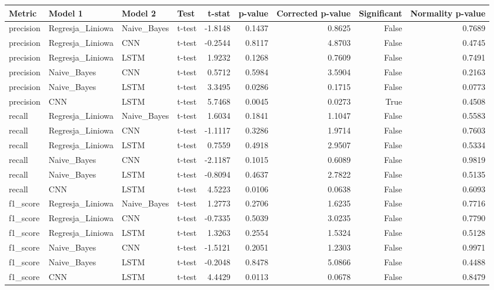 \begin{tabular}{llllrrrrr}
\toprule
Metric & Model 1 & Model 2 & Test & t-stat & p-value & Corrected p-value & Significant & Normality p-value \\
\midrule
precision & Regresja_Liniowa & Naive_Bayes & t-test & -1.8148 & 0.1437 & 0.8625 & False & 0.7689 \\
precision & Regresja_Liniowa & CNN & t-test & -0.2544 & 0.8117 & 4.8703 & False & 0.4745 \\
precision & Regresja_Liniowa & LSTM & t-test & 1.9232 & 0.1268 & 0.7609 & False & 0.7491 \\
precision & Naive_Bayes & CNN & t-test & 0.5712 & 0.5984 & 3.5904 & False & 0.2163 \\
precision & Naive_Bayes & LSTM & t-test & 3.3495 & 0.0286 & 0.1715 & False & 0.0773 \\
precision & CNN & LSTM & t-test & 5.7468 & 0.0045 & 0.0273 & True & 0.4508 \\
recall & Regresja_Liniowa & Naive_Bayes & t-test & 1.6034 & 0.1841 & 1.1047 & False & 0.5583 \\
recall & Regresja_Liniowa & CNN & t-test & -1.1117 & 0.3286 & 1.9714 & False & 0.7603 \\
recall & Regresja_Liniowa & LSTM & t-test & 0.7559 & 0.4918 & 2.9507 & False & 0.5334 \\
recall & Naive_Bayes & CNN & t-test & -2.1187 & 0.1015 & 0.6089 & False & 0.9819 \\
recall & Naive_Bayes & LSTM & t-test & -0.8094 & 0.4637 & 2.7822 & False & 0.5135 \\
recall & CNN & LSTM & t-test & 4.5223 & 0.0106 & 0.0638 & False & 0.6093 \\
f1_score & Regresja_Liniowa & Naive_Bayes & t-test & 1.2773 & 0.2706 & 1.6235 & False & 0.7716 \\
f1_score & Regresja_Liniowa & CNN & t-test & -0.7335 & 0.5039 & 3.0235 & False & 0.7790 \\
f1_score & Regresja_Liniowa & LSTM & t-test & 1.3263 & 0.2554 & 1.5324 & False & 0.5128 \\
f1_score & Naive_Bayes & CNN & t-test & -1.5121 & 0.2051 & 1.2303 & False & 0.9971 \\
f1_score & Naive_Bayes & LSTM & t-test & -0.2048 & 0.8478 & 5.0866 & False & 0.4488 \\
f1_score & CNN & LSTM & t-test & 4.4429 & 0.0113 & 0.0678 & False & 0.8479 \\
\bottomrule
\end{tabular}
